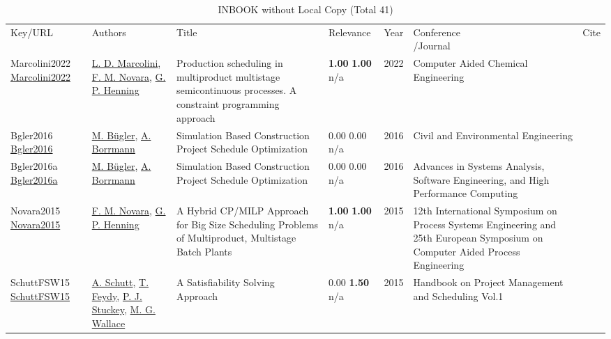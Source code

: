 {\scriptsize
\begin{longtable}{p{3cm}p{5cm}p{10cm}p{1cm}rp{2.5cm}l}
\rowcolor{white}\caption{INBOOK without Local Copy (Total 41)}\\ \toprule
\rowcolor{white}Key/URL & Authors & Title & Relevance &Year & \shortstack{Conference\\/Journal} & Cite\\ \midrule
\endhead
\bottomrule
\endfoot
Marcolini2022 \href{http://dx.doi.org/10.1016/b978-0-323-85159-6.50083-x}{Marcolini2022} & \hyperref[auth:a2042]{L. D. Marcolini}, \hyperref[auth:a586]{F. M. Novara}, \hyperref[auth:a587]{G. P. Henning} & Production scheduling in multiproduct multistage semicontinuous processes. A constraint programming approach & \noindent{}\textbf{1.00} \textbf{1.00} n/a & 2022 & Computer Aided Chemical Engineering & \cite{Marcolini2022}\\
Bgler2016 \href{http://dx.doi.org/10.4018/978-1-4666-9619-8.ch006}{Bgler2016} & \hyperref[auth:a1542]{M. Bügler}, \hyperref[auth:a1543]{A. Borrmann} & \cellcolor{gold!20}Simulation Based Construction Project Schedule Optimization & \noindent{}\textcolor{black!50}{0.00} \textcolor{black!50}{0.00} n/a & 2016 & Civil and Environmental Engineering & \cite{Bgler2016}\\
Bgler2016a \href{http://dx.doi.org/10.4018/978-1-4666-8823-0.ch016}{Bgler2016a} & \hyperref[auth:a1542]{M. Bügler}, \hyperref[auth:a1543]{A. Borrmann} & Simulation Based Construction Project Schedule Optimization & \noindent{}\textcolor{black!50}{0.00} \textcolor{black!50}{0.00} n/a & 2016 & Advances in Systems Analysis, Software Engineering, and High Performance Computing & \cite{Bgler2016a}\\
Novara2015 \href{http://dx.doi.org/10.1016/b978-0-444-63576-1.50032-7}{Novara2015} & \hyperref[auth:a586]{F. M. Novara}, \hyperref[auth:a587]{G. P. Henning} & A Hybrid CP/MILP Approach for Big Size Scheduling Problems of Multiproduct, Multistage Batch Plants & \noindent{}\textbf{1.00} \textbf{1.00} n/a & 2015 & 12th International Symposium on Process Systems Engineering and 25th European Symposium on Computer Aided Process Engineering & \cite{Novara2015}\\
SchuttFSW15 \href{https://doi.org/10.1007/978-3-319-05443-8_7}{SchuttFSW15} & \hyperref[auth:a124]{A. Schutt}, \hyperref[auth:a154]{T. Feydy}, \hyperref[auth:a125]{P. J. Stuckey}, \hyperref[auth:a117]{M. G. Wallace} & A Satisfiability Solving Approach & \noindent{}\textcolor{black!50}{0.00} \textbf{1.50} n/a & 2015 & Handbook on Project Management and Scheduling Vol.1 & \cite{SchuttFSW15}\\

\end{longtable}}
